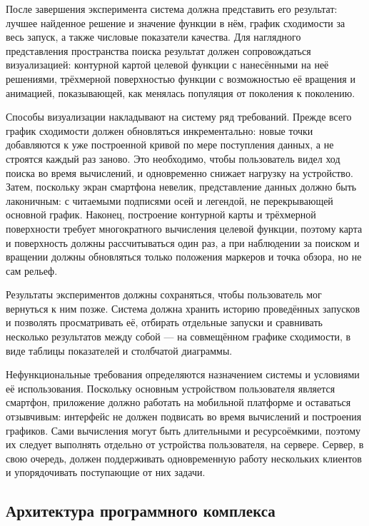\documentclass[14pt, a4paper]{extarticle}
\begin{document}
После завершения эксперимента система должна представить его результат: лучшее
найденное решение и значение функции в нём, график сходимости за весь запуск,
а также числовые показатели качества. Для наглядного представления пространства
поиска результат должен сопровождаться визуализацией: контурной картой целевой
функции с нанесёнными на неё решениями, трёхмерной поверхностью функции с
возможностью её вращения и анимацией, показывающей, как менялась популяция от
поколения к поколению.

Способы визуализации накладывают на систему ряд требований. Прежде всего график 
сходимости должен обновляться инкрементально: новые точки добавляются к уже 
построенной кривой по мере поступления данных, а не строятся каждый раз заново. 
Это необходимо, чтобы пользователь видел ход поиска во время вычислений, и одновременно 
снижает нагрузку на устройство. Затем, поскольку экран смартфона невелик, представление данных
должно быть лаконичным: с читаемыми подписями осей и легендой, не перекрывающей
основной график. Наконец, построение контурной карты и трёхмерной поверхности
требует многократного вычисления целевой функции, поэтому карта и поверхность
должны рассчитываться один раз, а при наблюдении за поиском и вращении должны
обновляться только положения маркеров и точка обзора, но не сам рельеф.

Результаты экспериментов должны сохраняться, чтобы пользователь мог вернуться к
ним позже. Система должна хранить историю проведённых запусков и позволять
просматривать её, отбирать отдельные запуски и сравнивать несколько результатов
между собой --- на совмещённом графике сходимости, в виде таблицы показателей и
столбчатой диаграммы.

Нефункциональные требования определяются назначением системы и условиями её
использования. Поскольку основным устройством пользователя является смартфон,
приложение должно работать на мобильной платформе и оставаться отзывчивым:
интерфейс не должен подвисать во время вычислений и построения графиков. Сами
вычисления могут быть длительными и ресурсоёмкими, поэтому их следует выполнять
отдельно от устройства пользователя, на сервере. Сервер, в свою очередь, должен
поддерживать одновременную работу нескольких клиентов и упорядочивать поступающие
от них задачи.

\subsection{Архитектура программного комплекса}
\label{subsec:architecture}
\end{document}
